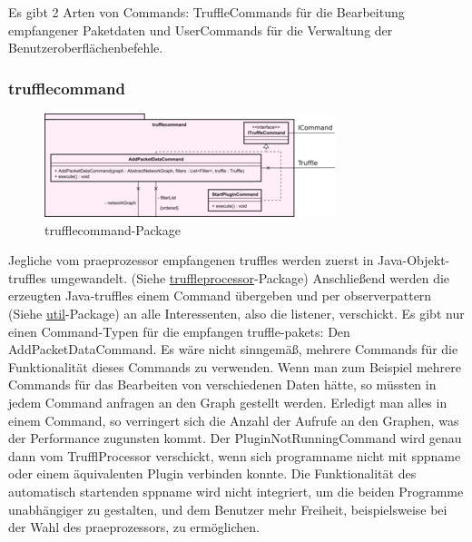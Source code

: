 Es gibt 2 Arten von Commands: TruffleCommands für die Bearbeitung empfangener
Paketdaten und UserCommands für die Verwaltung der Benutzeroberflächenbefehle.

      \subsubsection{trufflecommand}
      \label{subsubsec:trufflecommand}

      \begin{figure}[H]
        \centering
        \includegraphics[width=\textwidth]{../diagramimages/trufflecommand.png}
        \caption{trufflecommand-Package}
      \end{figure}

      \medskip
      Jegliche vom \gls{praeprozessor} empfangenen \glspl{truffle} werden zuerst in Java-Objekt-\glspl{truffle} umgewandelt. (Siehe
      \hyperref[subsubsec:truffleprocessor]{truffleprocessor}-Package) Anschließend
      werden die erzeugten Java-\glspl{truffle} einem Command übergeben und per \gls{observerpattern}
      (Siehe \hyperref[subsec:util]{util}-Package) an alle Interessenten, also die \gls{listener}, verschickt.
      \newline
      \newline
      Es gibt nur einen Command-Typen für die empfangen \gls{truffle}-\glspl{paket}: Den
      AddPacketDataCommand. Es wäre nicht sinngemäß, mehrere Commands für die Funktionalität
      dieses Commands zu verwenden. Wenn man zum Beispiel mehrere Commands für das Bearbeiten von
      verschiedenen Daten hätte, so müssten in jedem Command anfragen an den Graph gestellt werden.
      Erledigt man alles in einem Command, so verringert sich die Anzahl der Aufrufe an den Graphen,
      was der Performance zugunsten kommt.
      \newline
      \newline
      Der PluginNotRunningCommand wird genau dann vom TrufflProcessor verschickt, wenn sich \gls{programname} nicht mit \gls{sppname} oder einem äquivalenten Plugin verbinden konnte. Die Funktionalität des automatisch startenden \gls{sppname} wird nicht integriert, um die beiden Programme unabhängiger zu gestalten, und dem Benutzer mehr Freiheit, beispielsweise bei der Wahl des \gls{praeprozessor}s, zu ermöglichen.

